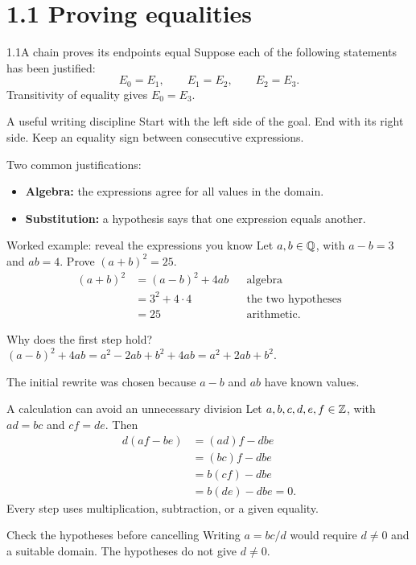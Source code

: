 \section{1.1 Proving equalities}
\begin{frame}{1.1\quad A chain proves its endpoints equal}
Suppose each of the following statements has been justified:
\[
E_0=E_1,\qquad E_1=E_2,\qquad E_2=E_3.
\]
Transitivity of equality gives $E_0=E_3$.
\begin{block}{A useful writing discipline}
Start with the left side of the goal. End with its right side.
Keep an equality sign between consecutive expressions.
\end{block}
Two common justifications:
\begin{itemize}
\item \textbf{Algebra:} the expressions agree for all values in the domain.
\item \textbf{Substitution:} a hypothesis says that one expression equals another.
\end{itemize}
\end{frame}

\begin{frame}{Worked example: reveal the expressions you know}
Let $a,b\in\mathbb{Q}$, with $a-b=3$ and $ab=4$. Prove $(a+b)^2=25$.
\[
\begin{aligned}
(a+b)^2
 &= (a-b)^2+4ab &&\text{algebra}\\
 &= 3^2+4\cdot4 &&\text{the two hypotheses}\\
 &=25 &&\text{arithmetic}.
\end{aligned}
\]
\begin{block}{Why does the first step hold?}
$(a-b)^2+4ab=a^2-2ab+b^2+4ab=a^2+2ab+b^2$.
\end{block}
The initial rewrite was chosen because $a-b$ and $ab$ have known values.
\end{frame}

\begin{frame}{A calculation can avoid an unnecessary division}
Let $a,b,c,d,e,f\in\mathbb{Z}$, with $ad=bc$ and $cf=de$.
Then
\[
\begin{aligned}
d(af-be)&=(ad)f-dbe\\
        &=(bc)f-dbe\\
        &=b(cf)-dbe\\
        &=b(de)-dbe=0.
\end{aligned}
\]
Every step uses multiplication, subtraction, or a given equality.
\begin{block}{Check the hypotheses before cancelling}
Writing $a=bc/d$ would require $d\ne0$ and a suitable domain.
The hypotheses do not give $d\ne0$.
\end{block}
\end{frame}

